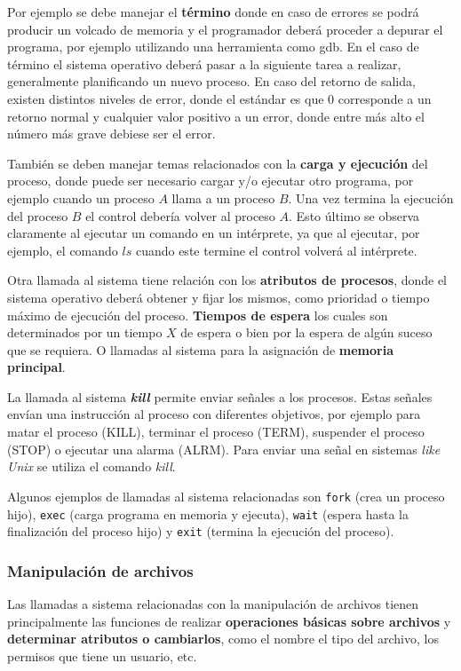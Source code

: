 Por ejemplo se debe manejar el \textbf{término} donde en caso de errores se
podrá producir un volcado de memoria y el programador deberá proceder a depurar
el programa, por ejemplo utilizando una herramienta como gdb. En el caso de
término el sistema operativo deberá pasar a la siguiente tarea a realizar,
generalmente planificando un nuevo proceso. En caso del retorno de salida,
existen distintos niveles de error, donde el estándar es que 0 corresponde a un
retorno normal y cualquier valor positivo a un error, donde entre más alto el
número más grave debiese ser el error.

También se deben manejar temas relacionados con la \textbf{carga y ejecución}
del proceso, donde puede ser necesario cargar y/o ejecutar otro programa, por
ejemplo cuando un proceso $A$ llama a un proceso $B$. Una vez termina la
ejecución del proceso $B$ el control debería volver al proceso $A$. Esto último
se observa claramente al ejecutar un comando en un intérprete, ya que al
ejecutar, por ejemplo, el comando $ls$ cuando este termine el control volverá al
intérprete.

Otra llamada al sistema tiene relación con los \textbf{atributos de procesos},
donde el sistema operativo deberá obtener y fijar los mismos, como prioridad o
tiempo máximo de ejecución del proceso. \textbf{Tiempos de espera} los cuales
son determinados por un tiempo $X$ de espera o bien por la espera de algún
suceso que se requiera. O llamadas al sistema para la asignación de
\textbf{memoria principal}.

La llamada al sistema \textbf{\textit{kill}} permite enviar señales a los
procesos. Estas señales envían una instrucción al proceso con diferentes
objetivos, por ejemplo para matar el proceso (KILL), terminar el proceso (TERM),
suspender el proceso (STOP) o ejecutar una alarma (ALRM). Para enviar una señal
en sistemas \textit{like Unix} se utiliza el comando \textit{kill}.

Algunos ejemplos de llamadas al sistema relacionadas son \texttt{fork} (crea un
proceso hijo), \texttt{exec} (carga programa en memoria y ejecuta),
\texttt{wait} (espera hasta la finalización del proceso hijo) y \texttt{exit}
(termina la ejecución del proceso).

\subsubsection{Manipulación de archivos}
Las llamadas a sistema relacionadas con la manipulación de archivos tienen
principalmente las funciones de realizar \textbf{operaciones básicas sobre
archivos} y \textbf{determinar atributos o cambiarlos}, como el nombre el tipo
del archivo, los permisos que tiene un usuario, etc.

